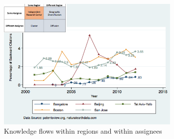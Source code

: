 \documentclass[parskip=full,11pt,letterpaper]{article}
\begin{document}
\begin{figure}[h]
\begin{centering}
  \includegraphics[width=0.80\textwidth]{SMSSameRegionSameAssigneeFlows}
  \caption{Knowledge flows within regions and within assignees}
  \label{fig:SMSSameRegionSameAssigneeFlows}
\end{centering}
\end{figure}
\end{document}
